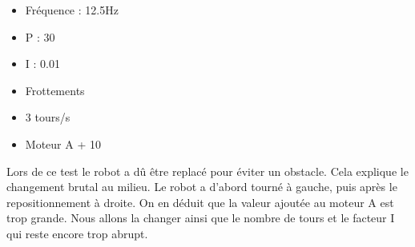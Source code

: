 \documentclass[
	a4paper,									%
	11pt,										%
	twoside,									%
	openright,									%
	notitlepage,									%
	parskip=half,								%
]{scrreprt}										%
\begin{document}
\begin{center}
    
    
    \begin{itemize}
        \item Fréquence : 12.5Hz
        \item P : 30
        \item I : 0.01
        \item Frottements
        \item 3 tours/s
        \item Moteur A + 10
    \end{itemize}
    \end{center}

Lors de ce test le robot a dû être replacé pour éviter un obstacle. Cela explique le changement brutal au milieu. Le robot a d'abord tourné à 
gauche, puis après le repositionnement à droite. On en déduit que la valeur ajoutée au moteur A est trop grande. Nous allons la changer ainsi 
que le nombre de tours et le facteur I qui reste encore trop abrupt. \par
\end{document}
